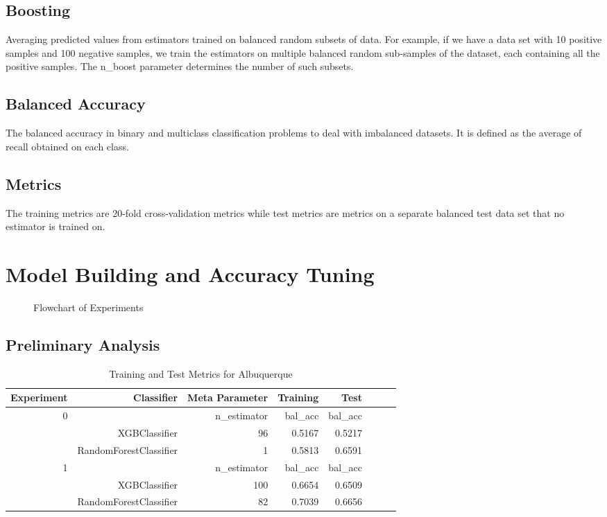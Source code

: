 \documentclass[10pt]{article}
\begin{document}
\subsection{Boosting}
Averaging predicted values from estimators trained on balanced random
subsets of data. For example, if we have a data set with 10 positive
samples and 100 negative samples, we train the estimators on multiple
balanced random sub-samples of the dataset, each containing all the 
positive samples. The n\_boost parameter determines the number of such
subsets.\par
\subsection{Balanced Accuracy}
The balanced accuracy in binary and multiclass classification problems to
deal with imbalanced datasets. It is defined as the average of recall
obtained on each class.\par
\subsection{Metrics}
The training metrics are 20-fold cross-validation metrics while test
metrics are metrics on a separate balanced test data set that no estimator
is trained on.\par
\section{Model Building and Accuracy Tuning}
\begin{figure}[H]
    \centering
    
    \caption{Flowchart of Experiments}
\end{figure}

\subsection{Preliminary Analysis}
\begin{table}[H]
    \caption{Training and Test Metrics for Albuquerque}
    \centering
    \begin{tabular}{|r|r|r|r|r|r|r|r|r|}
        \hline
        Experiment &Classifier &\multicolumn{2}{|r|}{Meta Parameter}
        &Training
        &Test\\
        \hline
        \hline
        0 & &\multicolumn{2}{|r|}{n\_estimator}
        &bal\_acc
        &bal\_acc\\
        \hline
        &XGBClassifier &\multicolumn{2}{|r|}{96} &0.5167 &0.5217\\
        \hline
        &RandomForestClassifier &\multicolumn{2}{|r|}{1} &0.5813 &0.6591\\
        \hline
        \hline
        1 & &\multicolumn{2}{|r|}{n\_estimator}
        &bal\_acc
        &bal\_acc\\
        \hline
        &XGBClassifier &\multicolumn{2}{|r|}{100} &0.6654 &0.6509\\
        \hline
        &RandomForestClassifier &\multicolumn{2}{|r|}{82} &0.7039 &0.6656\\
        \hline
    \end{tabular}
\end{table}
\end{document}
